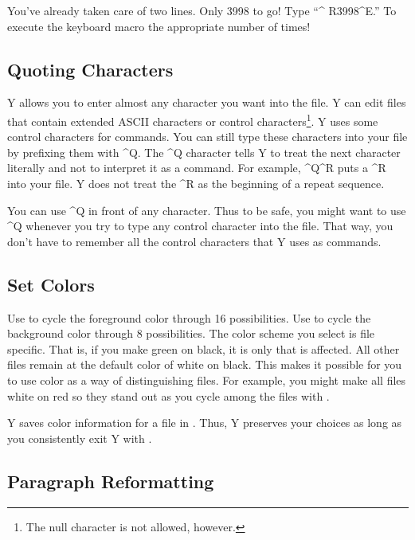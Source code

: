 You've already taken care of two lines. Only 3998 to go! Type ``\textasciicircum
R3998\textasciicircum E.'' To execute the keyboard macro the appropriate number of times!

\subsection{Quoting Characters}

Y allows you to enter almost any character you want into the file. Y can edit files that contain
extended ASCII characters or control characters\footnote{The null character is not allowed,
  however.}. Y uses some control characters for commands. You can still type these characters
into your file by prefixing them with \textasciicircum Q. The \textasciicircum Q character tells
Y to treat the next character literally and not to interpret it as a command. For example,
\textasciicircum Q\textasciicircum R puts a \textasciicircum R into your file. Y does not treat
the \textasciicircum R as the beginning of a repeat sequence.

You can use \textasciicircum Q in front of any character. Thus to be safe, you might want to use
\textasciicircum Q whenever you try to type any control character into the file. That way, you
don't have to remember all the control characters that Y uses as commands.

\subsection{Set Colors}

Use  to cycle the foreground color through 16 possibilities. Use  to
cycle the background color through 8 possibilities. The color scheme you select is file
specific. That is, if you make  green on black, it is only
 that is affected. All other files remain at the default color of white on
black. This makes it possible for you to use color as a way of distinguishing files. For
example, you might make all  files white on red so they stand out as you cycle
among the files with .

Y saves color information for a file in . Thus, Y preserves your choices
as long as you consistently exit Y with .

\subsection{Paragraph Reformatting}


